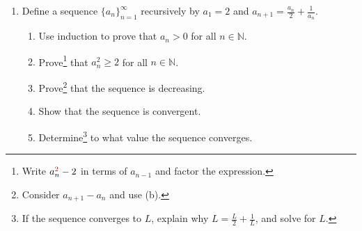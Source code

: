 \documentclass[12pt]{amsart}
\newcommand{\N}{\mathbb{N}}
\begin{document}
\begin{enumerate}


\item Define a sequence $\{a_n\}_{n=1}^\infty$ recursively by $a_1=2$ and $\displaystyle a_{n+1} = \frac{a_{n}}{2} + \frac{1}{a_{n}}$.
\begin{enumerate}
\item Use induction to prove that $a_n>0$ for all $n\in \N$.
\item Prove\footnote{Write $a_{n}^{{\color{chianti} 2}}-2$ in terms of $a_{n-1}$ and factor the expression.} that $a_n^2 \geq 2$ for all $n\in \N$.
\item Prove\footnote{Consider $a_{n+1}-a_n$ and use (b).} that the sequence is decreasing.
\item Show that the sequence is convergent.
\item Determine\footnote{If the sequence converges to $L$, explain why $L = \frac{L}{2} + \frac{1}{L}$, and solve for $L$.} to what value the sequence converges.
\end{enumerate}





\end{enumerate}
\end{document}
